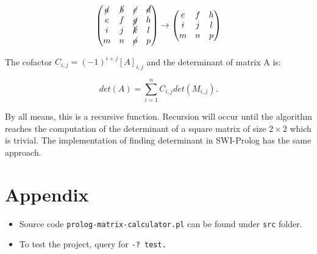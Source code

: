 \documentclass[a4paper]{article}
\begin{document}
\[
\begin{pmatrix}
        \cancel{a} & \cancel{b} & \cancel{c} & \cancel{d}\\
        e & f & \cancel{g} & h\\
        i & j & \cancel{k} & l\\
        m & n & \cancel{o} & p\\
\end{pmatrix}
\rightarrow
\begin{pmatrix}
        e & f & h\\
        i & j & l\\
        m & n & p\\
\end{pmatrix}
\]

The cofactor $C_{i,j} = (-1)^{i+j}[A]_{i,j}$ and the determinant of matrix A is:

\[
det(A) = \sum_{i=1}^nC_{i,j}det(M_{i,j}).
\]

By all means, this is a recursive function. Recursion will occur until the algorithm reaches the computation of the determinant of a square matrix of size $2\times2$ which is trivial. The implementation of finding determinant in SWI-Prolog has the same approach. 




\section*{Appendix}
\begin{itemize}
\item Source code \texttt{prolog-matrix-calculator.pl} can be found under \texttt{src} folder.
\item To test the project, query for \texttt{-? test.}
\end{itemize}
\end{document}
